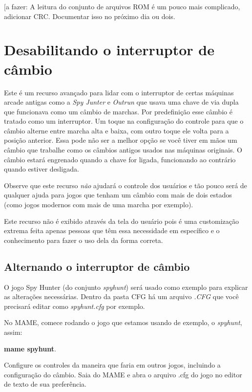 \documentclass[letterpaper,10pt,brazil]{sphinxmanual}
\begin{document}
{[}a fazer: A leitura do conjunto de arquivos ROM é um pouco mais
complicado, adicionar CRC. Documentar isso no próximo dia ou dois.


\section{Desabilitando o interruptor de câmbio}
\label{advanced/shiftertoggle::doc}\label{advanced/shiftertoggle:desabilitando-o-interruptor-de-cambio}
Este é um recurso avançado para lidar com o interruptor de certas
máquinas arcade antigas como a \emph{Spy Junter} e \emph{Outrun} que usava uma
chave de via dupla que funcionava como um câmbio de marchas. Por
predefinição esse câmbio é tratado como um interruptor. Um toque na
configuração do controle para que o câmbio alterne entre marcha alta e
baixa, com outro toque ele volta para a posição anterior. Essa pode não
ser a melhor opção se você tiver em mãos um câmbio que trabalhe como os
câmbios antigos usados nas máquinas originais.
O câmbio estará engrenado quando a chave for ligada, funcionando ao
contrário quando estiver desligada.

Observe que este recurso \emph{não} ajudará o controle dos usuários e tão
pouco será de qualquer ajuda para jogos que tenham um câmbio com
mais de dois estados (como jogos modernos com mais de uma marcha por
exemplo).

Este recurso não é exibido através da tela do usuário pois é uma
customização extrema feita apenas pessoas que têm essa necessidade em
específico e o conhecimento para fazer o uso dela da forma correta.


\subsection{Alternando o interruptor de câmbio}
\label{advanced/shiftertoggle:alternando-o-interruptor-de-cambio}
O jogo Spy Hunter (do conjunto \emph{spyhunt}) será usado como exemplo para
explicar as alterações necessárias. Dentro da pasta CFG há um arquivo
\emph{.CFG} que você precisará editar como \emph{spyhunt.cfg} por exemplo.

No MAME, comece rodando o jogo que estamos usando de exemplo, o
\emph{spyhunt}, assim:

\textbf{mame spyhunt}.

Configure os controles da maneira que faria em outros jogos, incluindo a
configuração do câmbio. Saia do MAME e abra o arquivo .cfg do jogo no
editor de texto de sua preferência.
\end{document}
